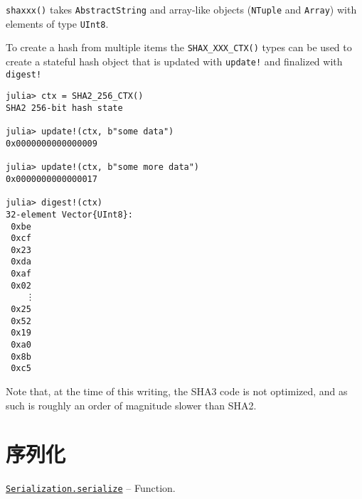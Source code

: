 \texttt{shaxxx()} takes \texttt{AbstractString} and array-like objects (\texttt{NTuple} and \texttt{Array}) with elements of type \texttt{UInt8}.



To create a hash from multiple items the \texttt{SHAX\_XXX\_CTX()} types can be used to create a stateful hash object that is updated with \texttt{update!} and finalized with \texttt{digest!}




\begin{verbatim}
julia> ctx = SHA2_256_CTX()
SHA2 256-bit hash state

julia> update!(ctx, b"some data")
0x0000000000000009

julia> update!(ctx, b"some more data")
0x0000000000000017

julia> digest!(ctx)
32-element Vector{UInt8}:
 0xbe
 0xcf
 0x23
 0xda
 0xaf
 0x02
    ⋮
 0x25
 0x52
 0x19
 0xa0
 0x8b
 0xc5
\end{verbatim}



Note that, at the time of this writing, the SHA3 code is not optimized, and as such is roughly an order of magnitude slower than SHA2.



\hypertarget{13724487893001117879}{}


\chapter{序列化}


\hypertarget{17931089632175850899}{}
\hyperlink{17931089632175850899}{\texttt{Serialization.serialize}}  -- {Function.}

